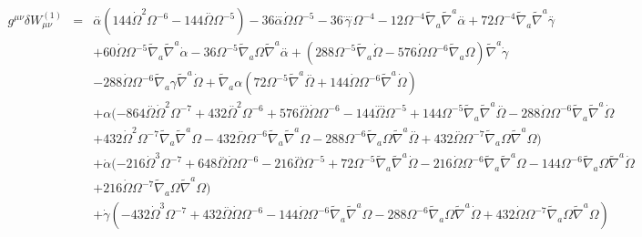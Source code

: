 \documentclass[10pt,letterpaper]{article}
\numberwithin{equation}{section}
\begin{document}
\begin{eqnarray}
g^{\mu\nu}\delta W^{(1)}_{\mu\nu}&=& \overset{..}{\alpha} (144 \dot{\Omega}^2 \Omega^{-6} - 144 \overset{..}{\Omega} \Omega^{-5}) - 36 \overset{...}{\alpha} \dot{\Omega} \Omega^{-5} - 36 \overset{....}{\gamma} \Omega^{-4} - 12 \Omega^{-4} \tilde{\nabla}_{a}\tilde{\nabla}^{a}\overset{..}{\alpha} + 72 \Omega^{-4} \tilde{\nabla}_{a}\tilde{\nabla}^{a}\overset{..}{\gamma} \nonumber \\ 
&& + 60 \dot{\Omega} \Omega^{-5} \tilde{\nabla}_{a}\tilde{\nabla}^{a}\dot{\alpha} - 36 \Omega^{-5} \tilde{\nabla}_{a}\Omega \tilde{\nabla}^{a}\overset{..}{\alpha} + (288 \Omega^{-5} \tilde{\nabla}_{a}\dot{\Omega} - 576 \dot{\Omega} \Omega^{-6} \tilde{\nabla}_{a}\Omega) \tilde{\nabla}^{a}\dot{\gamma} \nonumber \\ 
&& - 288 \dot{\Omega} \Omega^{-6} \tilde{\nabla}_{a}\gamma \tilde{\nabla}^{a}\dot{\Omega} + \tilde{\nabla}_{a}\alpha (72 \Omega^{-5} \tilde{\nabla}^{a}\overset{..}{\Omega} + 144 \dot{\Omega} \Omega^{-6} \tilde{\nabla}^{a}\dot{\Omega}) \nonumber \\ 
&& + \alpha (-864 \overset{..}{\Omega} \dot{\Omega}^2 \Omega^{-7} + 432 \overset{..}{\Omega}^2 \Omega^{-6} + 576 \overset{...}{\Omega} \dot{\Omega} \Omega^{-6} - 144 \overset{....}{\Omega} \Omega^{-5} + 144 \Omega^{-5} \tilde{\nabla}_{a}\tilde{\nabla}^{a}\overset{..}{\Omega} - 288 \dot{\Omega} \Omega^{-6} \tilde{\nabla}_{a}\tilde{\nabla}^{a}\dot{\Omega}\nonumber\\
&& + 432 \dot{\Omega}^2 \Omega^{-7} \tilde{\nabla}_{a}\tilde{\nabla}^{a}\Omega - 432 \overset{..}{\Omega} \Omega^{-6} \tilde{\nabla}_{a}\tilde{\nabla}^{a}\Omega - 288 \Omega^{-6} \tilde{\nabla}_{a}\Omega \tilde{\nabla}^{a}\overset{..}{\Omega} + 432 \overset{..}{\Omega} \Omega^{-7} \tilde{\nabla}_{a}\Omega \tilde{\nabla}^{a}\Omega) \nonumber \\ 
&& + \dot{\alpha} (-216 \dot{\Omega}^3 \Omega^{-7} + 648 \overset{..}{\Omega} \dot{\Omega} \Omega^{-6} - 216 \overset{...}{\Omega} \Omega^{-5} + 72 \Omega^{-5} \tilde{\nabla}_{a}\tilde{\nabla}^{a}\dot{\Omega} - 216 \dot{\Omega} \Omega^{-6} \tilde{\nabla}_{a}\tilde{\nabla}^{a}\Omega - 144 \Omega^{-6} \tilde{\nabla}_{a}\Omega \tilde{\nabla}^{a}\dot{\Omega}\nonumber\\
&& + 216 \dot{\Omega} \Omega^{-7} \tilde{\nabla}_{a}\Omega \tilde{\nabla}^{a}\Omega) \nonumber \\ 
&& + \dot{\gamma} (-432 \dot{\Omega}^3 \Omega^{-7} + 432 \overset{..}{\Omega} \dot{\Omega} \Omega^{-6} - 144 \dot{\Omega} \Omega^{-6} \tilde{\nabla}_{a}\tilde{\nabla}^{a}\Omega - 288 \Omega^{-6} \tilde{\nabla}_{a}\Omega \tilde{\nabla}^{a}\dot{\Omega} + 432 \dot{\Omega} \Omega^{-7} \tilde{\nabla}_{a}\Omega \tilde{\nabla}^{a}\Omega) \nonumber \\ 

\end{eqnarray}
\end{document}
